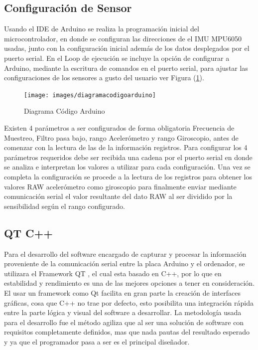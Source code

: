 \documentclass[12pt,a4paper]{article}
\begin{document}
\subsection{Configuración de Sensor}
Usando el IDE de Arduino se realiza la programación inicial del microcontrolador, en donde se configuran las direcciones de el IMU MPU6050 usadas, junto con la configuración inicial además de los datos desplegados por el puerto serial.
  En el Loop de ejecución se incluye la opción de configurar a Arduino, mediante la escritura de comandos en el puerto serial, para ajustar las configuraciones de los sensores a gusto del usuario ver Figura (\ref{fig:arduinocode}).

\begin{figure}[H]
\centering
	\texttt{[image: images/diagramacodigoarduino]}
	\caption{Diagrama Código Arduino}
	\label{fig:arduinocode}
\end{figure}
  
  Existen 4 parámetros a ser configurados de forma obligatoria Frecuencia de Muestreo, Filtro pasa bajo, rango Acelerómetro y  rango Giroscopio, antes de comenzar con la lectura de las de la información registros.
Para configurar los 4 parámetros requeridos debe ser recibida una cadena por el puerto serial en donde se analiza e interpretan los valores a utilizar para cada configuración. 
Una vez se completa la configuración se procede a la lectura de los registros para obtener los valores RAW acelerómetro como giroscopio para finalmente enviar mediante comunicación serial el valor resultante del dato RAW al ser dividido por la sensibilidad según el rango configurado.


\subsection{QT C++}
Para el desarrollo del software encargado de capturar y procesar la información proveniente de la comunicación serial entre la placa Arduino y el ordenador, se utilizara el Framework QT \cite{QT}, el cual esta basado en C++, por lo que en estabilidad y rendimiento es una de las mejores opciones a tener en consideración.
El usar un framework como Qt facilita en gran parte la creación de interfaces gráficas, cosa que C++ no trae por defecto, esto posibilita una integración rápida entre la parte lógica y visual del software a desarrollar.
La metodología usada para el desarrollo fue el método agiliza que al ser una solución de software con requisitos completamente definidos, mas que nada pautas del resultado esperado y ya que el programador pasa a ser es el principal diseñador.
\end{document}
